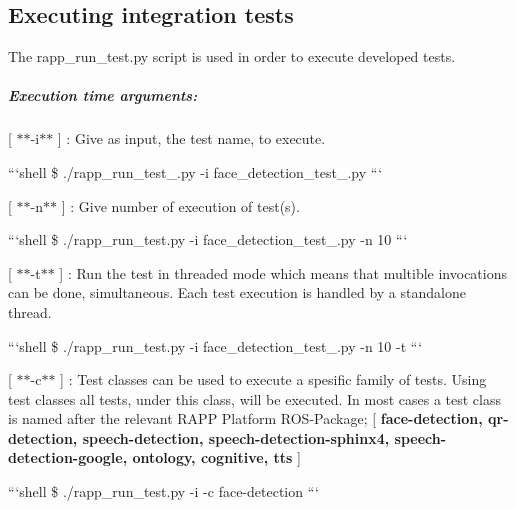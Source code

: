 \subsection*{Executing integration tests}

The rapp\-\_\-run\-\_\-test.\-py script is used in order to execute developed tests.

\subparagraph*{Execution time arguments\-:}


\begin{DoxyItemize}
\item \mbox{[} $\ast$$\ast$-\/i$\ast$$\ast$ \mbox{]} \-: Give as input, the test name, to execute.
\end{DoxyItemize}

```shell \$ ./rapp\-\_\-run\-\_\-test\-\_\-.py -\/i face\-\_\-detection\-\_\-test\-\_.\-py ```


\begin{DoxyItemize}
\item \mbox{[} $\ast$$\ast$-\/n$\ast$$\ast$ \mbox{]} \-: Give number of execution of test(s).
\end{DoxyItemize}

```shell \$ ./rapp\-\_\-run\-\_\-test.py -\/i face\-\_\-detection\-\_\-test\-\_.\-py -\/n 10 ```


\begin{DoxyItemize}
\item \mbox{[} $\ast$$\ast$-\/t$\ast$$\ast$ \mbox{]} \-: Run the test in threaded mode which means that multible invocations can be done, simultaneous. Each test execution is handled by a standalone thread.
\end{DoxyItemize}

```shell \$ ./rapp\-\_\-run\-\_\-test.py -\/i face\-\_\-detection\-\_\-test\-\_.\-py -\/n 10 -\/t ```


\begin{DoxyItemize}
\item \mbox{[} $\ast$$\ast$-\/c$\ast$$\ast$ \mbox{]} \-: Test classes can be used to execute a spesific family of tests. Using test classes all tests, under this class, will be executed. In most cases a test class is named after the relevant R\-A\-P\-P Platform R\-O\-S-\/\-Package; \mbox{[} {\bfseries face-\/detection, qr-\/detection, speech-\/detection, speech-\/detection-\/sphinx4, speech-\/detection-\/google, ontology, cognitive, tts} \mbox{]}
\end{DoxyItemize}

```shell \$ ./rapp\-\_\-run\-\_\-test.py -\/i -\/c face-\/detection ```

